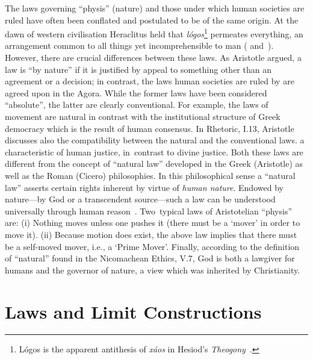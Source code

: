 \documentclass[12pt]{article}
\begin{document}
The laws governing ``physis'' (nature) and those under which human societies are ruled have often been conflated
and postulated to be of the same origin.
At the dawn of western civilisation Heraclitus held that {\it l\'ogos}\footnote{L\'ogos is the apparent antithesis of {\it x\'aos} in
Hesiod's {\it Theogony}~\cite{hesiod+700-2}.} permeates everything, %
an arrangement common to all things yet incomprehensible to man (\cite{Diels-fdv,Curd-PresocReader}   and~\cite{ki-57}).
However,
there are  crucial differences between these laws. As
Aristotle argued, a law is ``by nature'' if it is justified by appeal to something other than an agreement or a decision; in
contrast, the laws human societies are ruled by are agreed upon in the Agora. While the former laws have been considered  ``absolute'', the
latter are clearly conventional. For example, the laws of movement are natural  in contrast with
the institutional structure of Greek democracy which is the result of human consensus.
In Rhetoric, I.13, Aristotle discusses also the compatibility between
the natural and the conventional laws.
a  characteristic of human justice, in~contrast to divine justice. Both these
laws are different from the concept of ``natural law'' developed in the Greek (Aristotle) as well as the Roman
(Cicero) philosophies. In this philosophical sense a ``natural law''
asserts certain rights inherent by virtue of {\it  human nature}.
Endowed by nature---by God or a transcendent source---such a law can be understood universally through human
reason~\cite{natural_law2009}.
Two~typical laws of Aristotelian   ``physis'' are:
(i) Nothing moves unless one pushes it (there must be a `mover' in order to move it).
(ii) Because motion does exist, the above law implies that there must be a self-moved mover, i.e., a `Prime
Mover'.
Finally, according to the definition of ``natural'' found in the Nicomachean Ethics, V.7, God is both a lawgiver
for humans and the governor of nature,
a view which was inherited by Christianity.


\section{Laws and Limit Constructions}

\label{llc}
\end{document}
